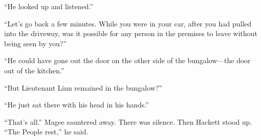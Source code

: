 {“He looked up and listened.”

“Let’s go back a few minutes. While you were in your car, after you had pulled into the driveway, was it possible for any person in the premises to leave without being seen by you?”

“He could have gone out the door on the other side of the bungalow—the door out of the kitchen.”

“But Lieutenant Linn remained in the bungalow?”

“He just sat there with his head in his hands.”

“That’s all.” Magee sauntered away. There was silence. Then Hackett stood up. “The People rest,” he said.

}

\vspace{2\nbs}
\clearpage
\thispagestyle{empty}


